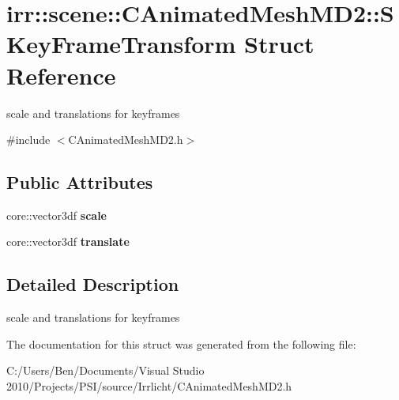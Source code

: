 \hypertarget{structirr_1_1scene_1_1_c_animated_mesh_m_d2_1_1_s_key_frame_transform}{\section{irr\-:\-:scene\-:\-:C\-Animated\-Mesh\-M\-D2\-:\-:S\-Key\-Frame\-Transform Struct Reference}
\label{structirr_1_1scene_1_1_c_animated_mesh_m_d2_1_1_s_key_frame_transform}
}


scale and translations for keyframes  




{\ttfamily \#include $<$C\-Animated\-Mesh\-M\-D2.\-h$>$}

\subsection*{Public Attributes}
\begin{DoxyCompactItemize}
\item 
\hypertarget{structirr_1_1scene_1_1_c_animated_mesh_m_d2_1_1_s_key_frame_transform_a697139ac67242cffd72a49dbb25c73a3}{core\-::vector3df {\bfseries scale}}\label{structirr_1_1scene_1_1_c_animated_mesh_m_d2_1_1_s_key_frame_transform_a697139ac67242cffd72a49dbb25c73a3}

\item 
\hypertarget{structirr_1_1scene_1_1_c_animated_mesh_m_d2_1_1_s_key_frame_transform_a777d848d9933cd33d70bf0ce6a4bde71}{core\-::vector3df {\bfseries translate}}\label{structirr_1_1scene_1_1_c_animated_mesh_m_d2_1_1_s_key_frame_transform_a777d848d9933cd33d70bf0ce6a4bde71}

\end{DoxyCompactItemize}


\subsection{Detailed Description}
scale and translations for keyframes 

The documentation for this struct was generated from the following file\-:\begin{DoxyCompactItemize}
\item 
C\-:/\-Users/\-Ben/\-Documents/\-Visual Studio 2010/\-Projects/\-P\-S\-I/source/\-Irrlicht/C\-Animated\-Mesh\-M\-D2.\-h\end{DoxyCompactItemize}
